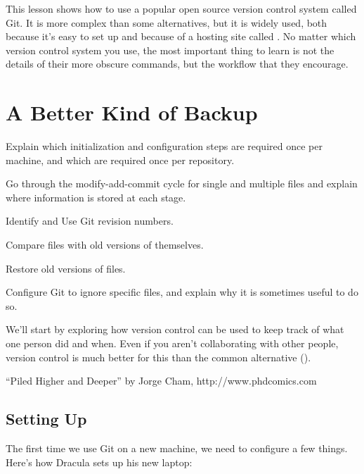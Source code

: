 This lesson shows how to use a popular open source version control
system called Git. It is more complex than some alternatives, but it is
widely used, both because it's easy to set up and because of a hosting
site called . No matter which version
control system you use, the most important thing to learn is not the
details of their more obscure commands, but the workflow that they
encourage.

\section{A Better Kind of Backup}

\begin{objectives}
\begin{swcitemize}
\item
  Explain which initialization and configuration steps are required once
  per machine, and which are required once per repository.
\item
  Go through the modify-add-commit cycle for single and multiple files
  and explain where information is stored at each stage.
\item
  Identify and Use Git revision numbers.
\item
  Compare files with old versions of themselves.
\item
  Restore old versions of files.
\item
  Configure Git to ignore specific files, and explain why it is
  sometimes useful to do so.
\end{swcitemize}
\end{objectives}

We'll start by exploring how version control can be used to keep track
of what one person did and when. Even if you aren't collaborating with
other people, version control is much better for this than the common
alternative ().


``Piled Higher and Deeper'' by Jorge Cham, http://www.phdcomics.com

\subsection*{Setting Up}

The first time we use Git on a new machine, we need to configure a few
things. Here's how Dracula sets up his new laptop:

